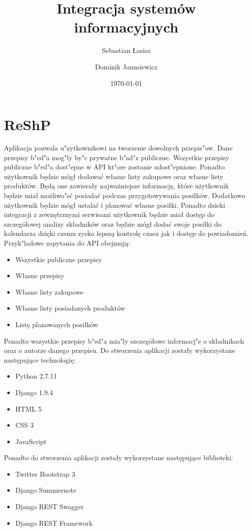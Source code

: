 \documentclass{article}
\title{Integracja systemów informacyjnych}
\author{
	Sebastian Łasisz
	\and
	Dominik Janusiewicz}
\date{\today}
\begin{document}
\maketitle

\section{ReShP}
	Aplikacja pozwala u"zytkownikowi na tworzenie dowolnych przepis"ow. Dane przepisy b"ed"a mog"ly by"c prywatne b"ad"z publiczne. Wszystkie przepisy publiczne b"ed"a dost"epne w API kt"ore zostanie udost"epnione. Ponadto użytkownik będzie mógł dodawać własne listy zakupowe oraz własne listy produktów. Będą one zawierały najważniejsze informację, które użytkownik będzie miał możliwo"sć posiadać podczas przygotowywania posiłków. Dodatkowo użytkownik będzie mógł ustalać i planować własne posiłki. Ponadto dzieki integracji z zewnętrznymi serwisami użytkownik będzie miał dostęp do szczegółowej analizy składników oraz będzie mógł dodać swoje posiłki do kalendarza dzięki czemu zyska lepszą kontrolę czasu jak i dostęp do powiadomień. Przyk"ladowe zapytania do API obejmują:
	\begin{itemize}
		\item Wszystkie publiczne  przepisy
		\item Własne przepisy
		\item Własne listy zakupowe
		\item Własne listy posiadanych produktów
		\item Listę planowanych posiłków
	\end{itemize}
Ponadto wszystkie przepisy b"ed"a mia"ly szczegółowe informacj"e o składnikach oraz o autorze danego przepisu.
Do stworzenia aplikacji zostały wykorzystane następujące technologię:
\begin{itemize}
\item Python 2.7.11
\item Django 1.9.4
\item HTML 5
\item CSS 3
\item JavaScript
\end{itemize}
Ponadto do stworzenia aplikacji zostały wykorzystane następujące biblioteki:
\begin{itemize}
\item Twitter Bootstrap 3
\item Django Summernote
\item Django REST Swagger
\item Django REST Framework
\end{itemize}
\end{document}
